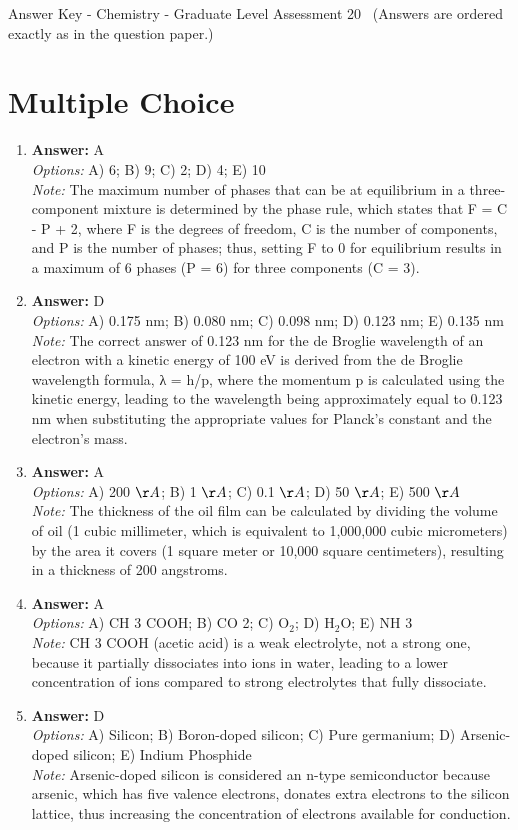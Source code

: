 \documentclass[12pt]{article}
\begin{document}
\begin{center}
Answer Key - Chemistry - Graduate Level Assessment 20 \
\small (Answers are ordered exactly as in the question paper.)
\end{center}

\section*{Multiple Choice}
\begin{enumerate}[label=\arabic*.]
\item \textbf{Answer:} A
\\ \textit{Options:} A) 6; B) 9; C) 2; D) 4; E) 10
\\ \textit{Note:} The maximum number of phases that can be at equilibrium in a three-component mixture is determined by the phase rule, which states that F = C - P + 2, where F is the degrees of freedom, C is the number of components, and P is the number of phases; thus, setting F to 0 for equilibrium results in a maximum of 6 phases (P = 6) for three components (C = 3).
\item \textbf{Answer:} D
\\ \textit{Options:} A) 0.175 nm; B) 0.080 nm; C) 0.098 nm; D) 0.123 nm; E) 0.135 nm
\\ \textit{Note:} The correct answer of 0.123 nm for the de Broglie wavelength of an electron with a kinetic energy of 100 eV is derived from the de Broglie wavelength formula, λ = h/p, where the momentum p is calculated using the kinetic energy, leading to the wavelength being approximately equal to 0.123 nm when substituting the appropriate values for Planck's constant and the electron's mass.
\item \textbf{Answer:} A
\\ \textit{Options:} A) 200 \ensuremath{\AA}; B) 1 \ensuremath{\AA}; C) 0.1 \ensuremath{\AA}; D) 50 \ensuremath{\AA}; E) 500 \ensuremath{\AA}
\\ \textit{Note:} The thickness of the oil film can be calculated by dividing the volume of oil (1 cubic millimeter, which is equivalent to 1,000,000 cubic micrometers) by the area it covers (1 square meter or 10,000 square centimeters), resulting in a thickness of 200 angstroms.
\item \textbf{Answer:} A
\\ \textit{Options:} A) CH 3 COOH; B) CO 2; C) O$_{2}$; D) H$_{2}$O; E) NH 3
\\ \textit{Note:} CH 3 COOH (acetic acid) is a weak electrolyte, not a strong one, because it partially dissociates into ions in water, leading to a lower concentration of ions compared to strong electrolytes that fully dissociate.
\item \textbf{Answer:} D
\\ \textit{Options:} A) Silicon; B) Boron-doped silicon; C) Pure germanium; D) Arsenic-doped silicon; E) Indium Phosphide
\\ \textit{Note:} Arsenic-doped silicon is considered an n-type semiconductor because arsenic, which has five valence electrons, donates extra electrons to the silicon lattice, thus increasing the concentration of electrons available for conduction.
\end{enumerate}
\end{document}
